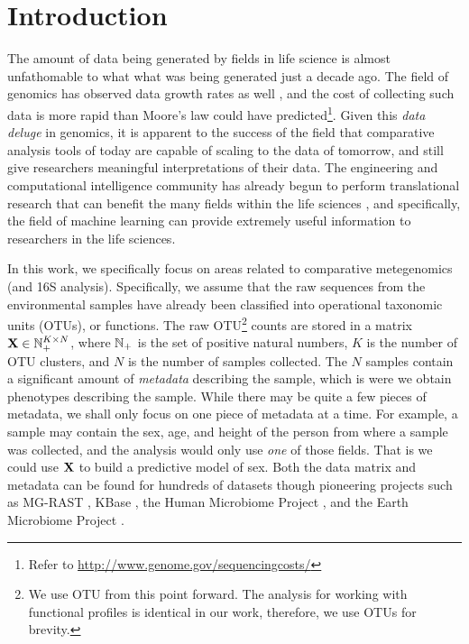 \documentclass{acm_proc_article-sp}
\begin{document}



\section{Introduction}

The amount of data being generated by fields in life science is almost unfathomable to what what was being  generated just a decade ago. The field of genomics has observed data growth rates as well \cite{BigDataBook}, and the cost of collecting such data is more rapid than Moore's law could have predicted\footnote{Refer to \url{http://www.genome.gov/sequencingcosts/}}. Given this {\em data deluge} in genomics, it is apparent to the success of the field that comparative analysis tools of today are capable of scaling to the data of tomorrow, and still give researchers meaningful interpretations of their data. The engineering and computational intelligence community has already begun to perform translational research that can benefit the many fields within the life sciences \cite{Vidyasagar2012CSM}, and specifically, the field of machine learning can provide extremely useful information to researchers in the life sciences. 


In this work, we specifically focus on areas related to comparative metegenomics (and 16S analysis). Specifically, we assume that the raw sequences from the environmental samples have already been classified into operational taxonomic units (OTUs), or functions. The raw OTU\footnote{We use OTU from this point forward. The analysis for working with functional profiles is identical in our work, therefore, we use OTUs for brevity.} counts are stored in a  matrix ${\mathbf X} \in {\mathbb N}_{+}^{K \times N}$, where ${\mathbb N}_{+}$ is the set of positive natural numbers, $K$ is the number of OTU clusters, and $N$ is the number of samples collected. The $N$ samples contain a significant amount of {\em metadata} describing the sample, which is were we obtain phenotypes describing the sample. While there may be quite a few pieces of metadata, we shall only focus on one piece of metadata at a time. For example, a sample may contain the sex, age, and height of the person from where a sample was collected, and the analysis would only use {\em one} of those fields. That is we could use ${\mathbf X}$ to build a predictive model of sex. Both the data matrix and metadata can be found for hundreds of datasets though pioneering projects such as MG-RAST \cite{Meyer2008BMCBio}, KBase \cite{KBase}, the Human Microbiome Project \cite{HMP2009}, and the Earth Microbiome Project \cite{Gilbert2010SGS}.  
\end{document}
